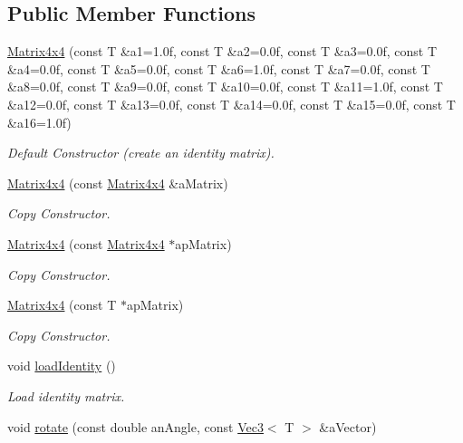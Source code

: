 \subsection*{Public Member Functions}
\begin{DoxyCompactItemize}
\item 
\hyperlink{class_math_1_1_matrix4x4_a583dabcedd11a91edc7dacada279e4aa}{Matrix4x4} (const T \&a1=1.0f, const T \&a2=0.0f, const T \&a3=0.0f, const T \&a4=0.0f, const T \&a5=0.0f, const T \&a6=1.0f, const T \&a7=0.0f, const T \&a8=0.0f, const T \&a9=0.0f, const T \&a10=0.0f, const T \&a11=1.0f, const T \&a12=0.0f, const T \&a13=0.0f, const T \&a14=0.0f, const T \&a15=0.0f, const T \&a16=1.0f)
\begin{DoxyCompactList}\small\item\em Default Constructor (create an identity matrix). \end{DoxyCompactList}\item 
\hyperlink{class_math_1_1_matrix4x4_ad5c78239a94616f752c798bd4f0cc65b}{Matrix4x4} (const \hyperlink{class_math_1_1_matrix4x4}{Matrix4x4} \&aMatrix)
\begin{DoxyCompactList}\small\item\em Copy Constructor. \end{DoxyCompactList}\item 
\hyperlink{class_math_1_1_matrix4x4_ab132c336e219ad10cbbdc463d78a5901}{Matrix4x4} (const \hyperlink{class_math_1_1_matrix4x4}{Matrix4x4} $\ast$apMatrix)
\begin{DoxyCompactList}\small\item\em Copy Constructor. \end{DoxyCompactList}\item 
\hyperlink{class_math_1_1_matrix4x4_a09e81e4099b8087cd9070bbda305f070}{Matrix4x4} (const T $\ast$apMatrix)
\begin{DoxyCompactList}\small\item\em Copy Constructor. \end{DoxyCompactList}\item 
void \hyperlink{class_math_1_1_matrix4x4_a3ebecfce2f332269e319462732a47f98}{loadIdentity} ()
\begin{DoxyCompactList}\small\item\em Load identity matrix. \end{DoxyCompactList}\item 
void \hyperlink{class_math_1_1_matrix4x4_a3d7bb382201ee3315ece0559453f8eac}{rotate} (const double anAngle, const \hyperlink{class_math_1_1_vec3}{Vec3}$<$ T $>$ \&aVector)

\end{DoxyCompactItemize}
